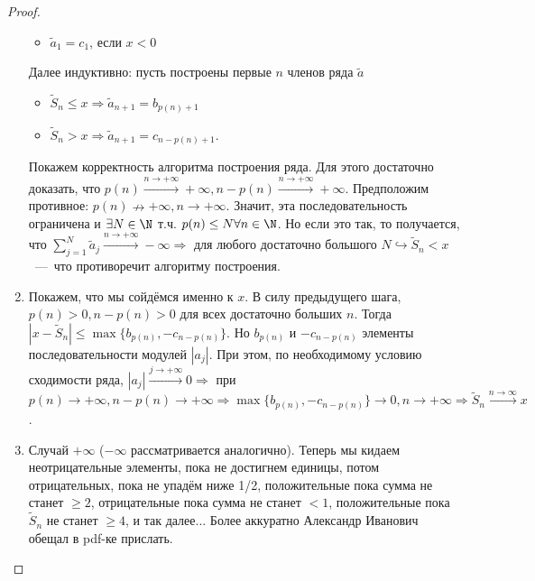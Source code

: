 \begin{proof}
\begin{enumerate}
\begin{itemize}
            \item $\tilde{a}_1 = c_1$, если $x < 0$
        \end{itemize}
        Далее индуктивно: пусть построены первые $n$ членов ряда $\tilde{a}$
        \begin{itemize}
            \item $\tilde{S}_n \leq x \Rightarrow \tilde{a}_{n + 1} = b_{p(n) + 1}$
            \item $\tilde{S}_n > x \Rightarrow \tilde{a}_{n + 1} = c_{n - p(n) + 1}$.
        \end{itemize}
        Покажем корректность алгоритма построения ряда. Для этого достаточно доказать, что $p(n) \xrightarrow{n \rightarrow +\infty} +\infty, n - p(n) \xrightarrow{n \rightarrow +\infty} +\infty$. Предположим противное:
        $p(n) \nrightarrow +\infty, n \rightarrow +\infty$. Значит, эта последовательность ограничена и $\exists N \in \N$ т.ч. $p(n) \leq N \forall n \in \N$. Но если это так, то получается, что $\sum\limits_{j = 1}^N \tilde{a}_j \xrightarrow{n \rightarrow +\infty} -\infty \Rightarrow$ для любого достаточно большого $N \hookrightarrow \tilde{S}_n < x$~---~что противоречит алгоритму построения.
        \item Покажем, что мы сойдёмся именно к $x$. В силу предыдущего шага, $p(n) > 0, n - p(n) > 0$ для всех достаточно больших $n$. Тогда $|x - \tilde{S}_n| \leq \max \{b_{p(n)}, -c_{n - p(n)}\}$. Но $b_{p(n)}$ и $-c_{n - p(n)}$ элементы последовательности модулей $|a_j|$. При этом, по необходимому условию сходимости ряда, $|a_j| \xrightarrow{j \rightarrow +\infty} 0 \Rightarrow$ при $p(n) \rightarrow +\infty, n - p(n) \rightarrow +\infty \Rightarrow \max \{b_{p(n)}, -c_{n - p(n)}\} \rightarrow 0, n \rightarrow +\infty \Rightarrow \tilde{S}_n \xrightarrow{n \rightarrow \infty} x$.
        \item Случай $+\infty$ ($-\infty$ рассматривается аналогично).
        Теперь мы кидаем неотрицательные элементы, пока не достигнем единицы, потом отрицательных, пока не упадём ниже 1/2, положительные пока сумма не станет $\geq 2$, отрицательные пока сумма не станет $< 1$, положительные пока $\tilde{S}_n$ не станет $\geq 4$, и так далее... Более аккуратно Александр Иванович обещал в pdf-ке прислать.
    \end{enumerate}
\end{proof}

